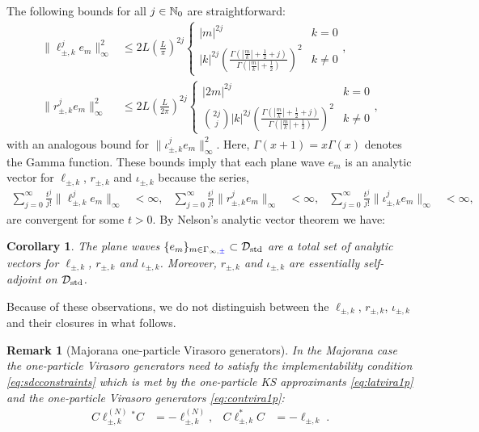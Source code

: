 \documentclass[a4paper, 11pt]{article}
\DeclareMathOperator{\1}{\mathds{1}}
\DeclareMathOperator{\std}{std}
\newtheorem{cor}[thm]{Corollary}
\newtheorem{rem}[thm]{Remark}
\begin{document}
The following bounds for all $j\in\mathbb{N}_{0}$ are straightforward:
\begin{align}
\label{eq:analyticvector}
\|\ell_{\pm,k}^{j}e_{m}\|_{\infty}^{2} & \leq 2L(\tfrac{L}{\pi})^{2j}\left\{\begin{matrix} |m|^{2j} & k=0 \\ |k|^{2j}\left(\tfrac{\Gamma(|\frac{m}{k}|+\frac{1}{2}+j)}{\Gamma(|\frac{m}{k}|+\frac{1}{2})}\right)^{2} & k\neq0 \end{matrix}\right.,\\ \nonumber
\|r_{\pm,k}^{j}e_{m}\|_{\infty}^{2} & \leq 2L(\tfrac{L}{2\pi})^{2j}\left\{\begin{matrix} |2 m|^{2j} & k=0 \\ \binom{2j}{j}|k|^{2j}\left(\tfrac{\Gamma(|\frac{m}{k}|+\frac{1}{2}+j)}{\Gamma(|\frac{m}{k}|+\frac{1}{2})}\right)^{2} & k\neq0 \end{matrix}\right.,
\end{align}
with an analogous bound for $\|\iota_{\pm,k}^{j}e_{m}\|_{\infty}^{2}$. Here, $\Gamma(x+1) = x\Gamma(x)$ denotes the Gamma function. These bounds imply that each plane wave $e_{m}$ is an analytic vector for $\ell_{\pm,k}$, $r_{\pm,k}$ and $\iota_{\pm,k}$ because the series,
\begin{align*}
\sum_{j=0}^{\infty}\tfrac{t^{j}}{j!}\|\ell_{\pm,k}^{j}e_{m}\|_{\infty} & < \infty, & \sum_{j=0}^{\infty}\tfrac{t^{j}}{j!}\|r_{\pm,k}^{j}e_{m}\|_{\infty} & < \infty, & \sum_{j=0}^{\infty}\tfrac{t^{j}}{j!}\|\iota_{\pm,k}^{j}e_{m}\|_{\infty} & < \infty,
\end{align*}
are convergent for some $t>0$. By Nelson’s analytic vector theorem \cite{NelsonAnalyticVectors, ReedMethodsOfModern2} we have:
\begin{cor}
\label{cor:viraesa}
The plane waves $\{e_{m}\}_{m\in\Gamma_{\infty,{\color{blue}\pm}}}\subset\cD_{\std}$ are a total set of analytic vectors for $\ell_{\pm,k}$, $r_{\pm,k}$ and $\iota_{\pm,k}$. Moreover, $r_{\pm,k}$ and $\iota_{\pm,k}$ are essentially self-adjoint on $\cD_{\std}$.
\end{cor}

Because of these observations, we do not distinguish between the $\ell_{\pm,k}$, $r_{\pm,k}$, $\iota_{\pm,k}$ and their closures in what follows.

\begin{rem}[Majorana one-particle Virasoro generators]
\label{rem:impcond}
In the Majorana case the one-particle Virasoro generators need to satisfy the implementability condition \eqref{eq:sdcconstraints} which is met by the one-particle KS approximants \eqref{eq:latvira1p} and the one-particle Virasoro generators \eqref{eq:contvira1p}:
\begin{align}
\label{eq:impcondKS}
C\ell^{(N)}_{\pm,k}{}^{*}C & = -\ell^{(N)}_{\pm,k}, & C\ell_{\pm,k}^{*}C & = -\ell_{\pm,k} \;.
\end{align}
\end{rem}
\end{document}
